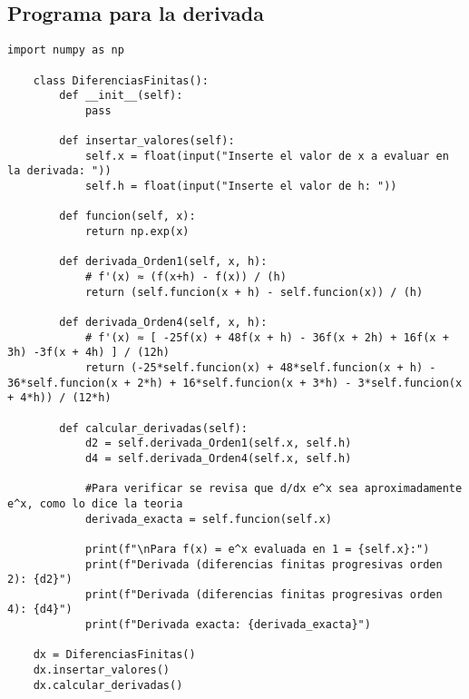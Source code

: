 \subsection*{Programa para la derivada}
\begin{lstlisting}[style=jupyter]
    import numpy as np

    class DiferenciasFinitas():
        def __init__(self):
            pass
    
        def insertar_valores(self):
            self.x = float(input("Inserte el valor de x a evaluar en la derivada: "))
            self.h = float(input("Inserte el valor de h: "))
    
        def funcion(self, x):
            return np.exp(x)
    
        def derivada_Orden1(self, x, h):
            # f'(x) ≈ (f(x+h) - f(x)) / (h)
            return (self.funcion(x + h) - self.funcion(x)) / (h)
    
        def derivada_Orden4(self, x, h):
            # f'(x) ≈ [ -25f(x) + 48f(x + h) - 36f(x + 2h) + 16f(x + 3h) -3f(x + 4h) ] / (12h)
            return (-25*self.funcion(x) + 48*self.funcion(x + h) - 36*self.funcion(x + 2*h) + 16*self.funcion(x + 3*h) - 3*self.funcion(x + 4*h)) / (12*h) 
    
        def calcular_derivadas(self):
            d2 = self.derivada_Orden1(self.x, self.h)
            d4 = self.derivada_Orden4(self.x, self.h)
    
            #Para verificar se revisa que d/dx e^x sea aproximadamente e^x, como lo dice la teoria
            derivada_exacta = self.funcion(self.x)
            
            print(f"\nPara f(x) = e^x evaluada en 1 = {self.x}:")
            print(f"Derivada (diferencias finitas progresivas orden 2): {d2}")
            print(f"Derivada (diferencias finitas progresivas orden 4): {d4}")
            print(f"Derivada exacta: {derivada_exacta}")
    
    dx = DiferenciasFinitas()
    dx.insertar_valores()
    dx.calcular_derivadas()
\end{lstlisting}
